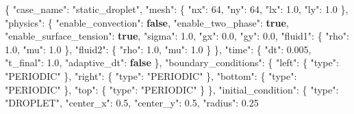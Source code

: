 \documentclass[
  french,
]{article}
\newenvironment{Shaded}{}{}
\newcommand{\DataTypeTok}[1]{\textcolor[rgb]{0.56,0.13,0.00}{#1}}
\newcommand{\DecValTok}[1]{\textcolor[rgb]{0.25,0.63,0.44}{#1}}
\newcommand{\FloatTok}[1]{\textcolor[rgb]{0.25,0.63,0.44}{#1}}
\newcommand{\FunctionTok}[1]{\textcolor[rgb]{0.02,0.16,0.49}{#1}}
\newcommand{\KeywordTok}[1]{\textcolor[rgb]{0.00,0.44,0.13}{\textbf{#1}}}
\newcommand{\StringTok}[1]{\textcolor[rgb]{0.25,0.44,0.63}{#1}}
\begin{document}
\begin{Shaded}
\begin{Highlighting}[]
\FunctionTok{\{}
  \DataTypeTok{"case\_name"}\FunctionTok{:} \StringTok{"static\_droplet"}\FunctionTok{,}
  \DataTypeTok{"mesh"}\FunctionTok{:} \FunctionTok{\{} \DataTypeTok{"nx"}\FunctionTok{:} \DecValTok{64}\FunctionTok{,} \DataTypeTok{"ny"}\FunctionTok{:} \DecValTok{64}\FunctionTok{,} \DataTypeTok{"lx"}\FunctionTok{:} \FloatTok{1.0}\FunctionTok{,} \DataTypeTok{"ly"}\FunctionTok{:} \FloatTok{1.0} \FunctionTok{\},}
  \DataTypeTok{"physics"}\FunctionTok{:} \FunctionTok{\{}
    \DataTypeTok{"enable\_convection"}\FunctionTok{:} \KeywordTok{false}\FunctionTok{,}
    \DataTypeTok{"enable\_two\_phase"}\FunctionTok{:} \KeywordTok{true}\FunctionTok{,}
    \DataTypeTok{"enable\_surface\_tension"}\FunctionTok{:} \KeywordTok{true}\FunctionTok{,}
    \DataTypeTok{"sigma"}\FunctionTok{:} \FloatTok{1.0}\FunctionTok{,}
    \DataTypeTok{"gx"}\FunctionTok{:} \FloatTok{0.0}\FunctionTok{,} \DataTypeTok{"gy"}\FunctionTok{:} \FloatTok{0.0}\FunctionTok{,}
    \DataTypeTok{"fluid1"}\FunctionTok{:} \FunctionTok{\{} \DataTypeTok{"rho"}\FunctionTok{:} \FloatTok{1.0}\FunctionTok{,} \DataTypeTok{"mu"}\FunctionTok{:} \FloatTok{1.0} \FunctionTok{\},}
    \DataTypeTok{"fluid2"}\FunctionTok{:} \FunctionTok{\{} \DataTypeTok{"rho"}\FunctionTok{:} \FloatTok{1.0}\FunctionTok{,} \DataTypeTok{"mu"}\FunctionTok{:} \FloatTok{1.0} \FunctionTok{\}}
  \FunctionTok{\},}
  \DataTypeTok{"time"}\FunctionTok{:} \FunctionTok{\{} \DataTypeTok{"dt"}\FunctionTok{:} \FloatTok{0.005}\FunctionTok{,} \DataTypeTok{"t\_final"}\FunctionTok{:} \FloatTok{1.0}\FunctionTok{,} \DataTypeTok{"adaptive\_dt"}\FunctionTok{:} \KeywordTok{false} \FunctionTok{\},}
  \DataTypeTok{"boundary\_conditions"}\FunctionTok{:} \FunctionTok{\{}
    \DataTypeTok{"left"}\FunctionTok{:}   \FunctionTok{\{} \DataTypeTok{"type"}\FunctionTok{:} \StringTok{"PERIODIC"} \FunctionTok{\},}
    \DataTypeTok{"right"}\FunctionTok{:}  \FunctionTok{\{} \DataTypeTok{"type"}\FunctionTok{:} \StringTok{"PERIODIC"} \FunctionTok{\},}
    \DataTypeTok{"bottom"}\FunctionTok{:} \FunctionTok{\{} \DataTypeTok{"type"}\FunctionTok{:} \StringTok{"PERIODIC"} \FunctionTok{\},}
    \DataTypeTok{"top"}\FunctionTok{:}    \FunctionTok{\{} \DataTypeTok{"type"}\FunctionTok{:} \StringTok{"PERIODIC"} \FunctionTok{\}}
  \FunctionTok{\},}
  \DataTypeTok{"initial\_condition"}\FunctionTok{:} \FunctionTok{\{}
    \DataTypeTok{"type"}\FunctionTok{:} \StringTok{"DROPLET"}\FunctionTok{,}
    \DataTypeTok{"center\_x"}\FunctionTok{:} \FloatTok{0.5}\FunctionTok{,} \DataTypeTok{"center\_y"}\FunctionTok{:} \FloatTok{0.5}\FunctionTok{,} \DataTypeTok{"radius"}\FunctionTok{:} \FloatTok{0.25}

\end{Highlighting}
\end{Shaded}
\end{document}
